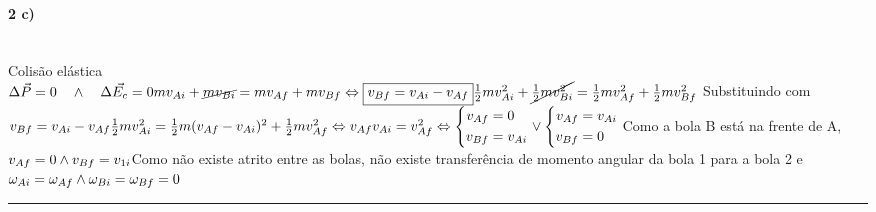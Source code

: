 \paragraph{2 c)} ~\\
Colisão elástica
\\
$
\Delta \vec{P}=0 \quad \wedge \quad \Delta \vec{E_c}=0\\
mv_{Ai}+\cancel{mv_{Bi}}=mv_{Af}+mv_{Bf}\Leftrightarrow \boxed{v_{Bf}=v_{Ai}-v_{Af}}\\ 
\frac{1}{2}mv_{Ai}^2+\cancel{\frac{1}{2}mv_{Bi}^2}=\frac{1}{2}mv_{Af}^2+\frac{1}{2}mv_{Bf}^2\\
\\
$
Substituindo com $v_{Bf}=v_{Ai}-v_{Af}\\
\frac{1}{2}mv_{Ai}^2=\frac{1}{2}m(v_{Af}-v_{Ai})^2+\frac{1}{2}mv_{Af}^2\\
\\
\Leftrightarrow v_{Af}v_{Ai}=v_{Af}^2
\Leftrightarrow \left \{
\begin{aligned}
v_{Af}&=0\\
v_{Bf}&=v_{Ai}\\
\end{aligned}
\right . 
\lor \left \{
\begin{aligned}
v_{Af}&=v_{Ai}\\
v_{Bf}&=0\\
\end{aligned}
\right . 
\\
\\
$Como a bola B está na frente de A, $v_{Af}=0 \land v_{Bf}=v_{1i}\\
$Como não existe atrito entre as bolas, não existe transferência de momento angular da bola 1 para a bola 2 e $\omega_{Ai}=\omega_{Af} \land \omega_{Bi}=\omega_{Bf}=0\\
$
\hrule
